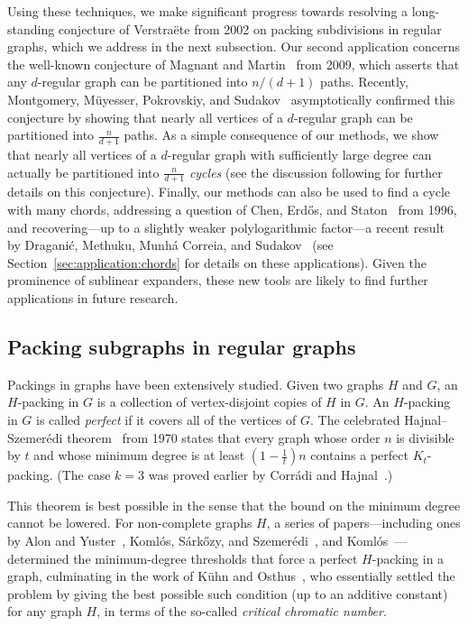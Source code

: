 \documentclass[10pt]{article}
\theoremstyle{plain}
\numberwithin{theorem}{section}
\theoremstyle{definition}
\theoremstyle{remark}
\theoremstyle{plain}
\begin{document}
Using these techniques, we make significant progress towards resolving a long-standing conjecture of Verstra\"ete from 2002 on packing subdivisions in regular graphs, which we address in the next subsection. Our second application concerns the well-known conjecture of Magnant and Martin~\cite{magnant2009note} from 2009, which asserts that any $d$-regular graph can be partitioned into $n/(d+1)$ paths. Recently, Montgomery, M\"uyesser, Pokrovskiy, and Sudakov~\cite{montgomery2024approximate} asymptotically confirmed this conjecture by showing that nearly all vertices of a $d$-regular graph can be partitioned into $\frac{n}{d+1}$ paths. As a simple consequence of our methods, we show that nearly all vertices of a $d$-regular graph with sufficiently large degree can actually be partitioned into $\frac{n}{d+1}$ \emph{cycles} (see the discussion following  for further details on this conjecture). Finally, our methods can also be used to find a cycle with many chords, addressing a question of Chen, Erd\H{o}s, and Staton~\cite{chen1996proof} from 1996, and recovering—up to a slightly weaker polylogarithmic factor—a recent result by Dragani\'c, Methuku, Munh\'a Correia, and Sudakov~\cite{draganic2023cycles} (see Section~\ref{sec:application:chords} for details on these applications). Given the prominence of sublinear expanders, these new tools are likely to find further applications in future research. 

\subsection{Packing subgraphs in regular graphs} 

Packings in graphs have been extensively studied. Given two graphs $H$ and $G$, an $H$-packing in $G$ is a collection of vertex-disjoint copies of $H$ in $G$. An $H$-packing in $G$ is called \emph{perfect} if it covers all of the vertices of $G$. The celebrated Hajnal--Szemer\'edi theorem~\cite{hajnal1970proof} from 1970 states that every graph whose order $n$ is divisible by $t$ and whose minimum degree is at least $(1 - \frac{1}{t})n$ contains a perfect $K_t$-packing. (The case $k = 3$ was proved earlier by Corr\'adi and Hajnal~\cite{corradi1963maximal}.)

This theorem is best possible in the sense that the bound on the minimum degree cannot be lowered. 
For non-complete graphs $H$, a series of papers—including ones by 
Alon and Yuster~\cite{alon1996h}, 
Koml\'os, S\'ark\H{o}zy, and Szemer\'edi~\cite{komlos2001proof}, 
and Koml\'os~\cite{komlos2000tiling}—
determined the minimum-degree thresholds that force a perfect $H$-packing in a graph, 
culminating in the work of K\"uhn and Osthus~\cite{kuhn2009minimum}, who essentially settled the problem by giving the best possible such condition (up to an additive constant) for any graph $H$, in terms of the so-called \emph{critical chromatic number}. 
\end{document}
